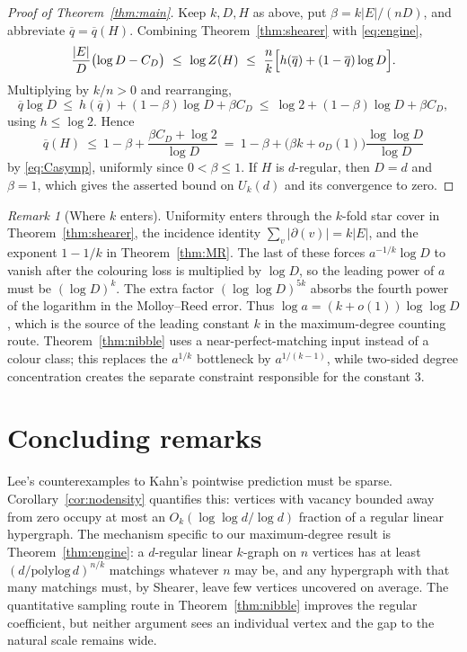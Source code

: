 \documentclass[11pt,a4paper]{amsart}
\theoremstyle{plain}
\theoremstyle{definition}
\theoremstyle{remark}
\newtheorem{remark}[theorem]{Remark}
\newcommand{\EE}{E}
\newcommand{\qbar}{\overline{q}}
\newcommand{\dg}{\partial}
\begin{document}
\begin{proof}[Proof of Theorem~\ref{thm:main}]
Keep $k,D,H$ as above, put $\beta=k|\EE|/(nD)$, and abbreviate $\qbar=\qbar(H)$. Combining
Theorem~\ref{thm:shearer} with \eqref{eq:engine},
\[
  \frac{|\EE|}{D}\bigl(\log D-C_D\bigr)\ \le\ \log Z(H)
  \ \le\ \frac{n}{k}\Bigl[h(\qbar)+(1-\qbar)\log D\Bigr].
\]
Multiplying by $k/n>0$ and rearranging,
\[
  \qbar\log D\ \le\ h(\qbar)+(1-\beta)\log D+\beta C_D
  \ \le\ \log2+(1-\beta)\log D+\beta C_D,
\]
using $h\le\log2$. Hence
\begin{equation}
\label{eq:final}
  \qbar(H)\ \le\ 1-\beta+\frac{\beta C_D+\log2}{\log D}
  \ =\ 1-\beta+\bigl(\beta k+o_D(1)\bigr)\frac{\log\log D}{\log D}
\end{equation}
by \eqref{eq:Casymp}, uniformly since $0<\beta\le1$. If $H$ is $d$-regular, then $D=d$
and $\beta=1$, which gives the asserted bound on $U_k(d)$ and its convergence to zero.
\end{proof}

\begin{remark}[Where $k$ enters]
\label{rem:kenters}
Uniformity enters through the $k$-fold star cover in Theorem~\ref{thm:shearer}, the
incidence identity $\sum_v|\dg(v)|=k|\EE|$, and the exponent $1-1/k$ in
Theorem~\ref{thm:MR}. The last of these forces $a^{-1/k}\log D$ to vanish after the
colouring loss is multiplied by $\log D$, so the leading power of $a$ must be
$(\log D)^k$. The extra factor $(\log\log D)^{5k}$ absorbs the fourth power of the
logarithm in the Molloy--Reed error. Thus $\log a=(k+o(1))\log\log D$, which is the
source of the leading constant $k$ in the maximum-degree counting route. Theorem~\ref{thm:nibble}
uses a near-perfect-matching input instead of a colour class; this replaces the
$a^{1/k}$ bottleneck by $a^{1/(k-1)}$, while two-sided degree concentration creates the
separate constraint responsible for the constant $3$.
\end{remark}

\section{Concluding remarks}
\label{sec:open}

Lee's counterexamples to Kahn's pointwise prediction must be sparse. Corollary~\ref{cor:nodensity}
quantifies this: vertices with vacancy bounded away from zero occupy at most an
$O_k(\log\log d/\log d)$ fraction of a regular linear hypergraph. The mechanism specific
to our maximum-degree result is Theorem~\ref{thm:engine}: a $d$-regular
linear $k$-graph on $n$ vertices has at least $(d/\mathrm{polylog}\,d)^{n/k}$ matchings
whatever $n$ may be, and any hypergraph with that many matchings must, by Shearer, leave
few vertices uncovered on average. The quantitative sampling route in
Theorem~\ref{thm:nibble} improves the regular coefficient, but neither argument sees an
individual vertex and the gap to the natural scale remains wide.
\end{document}
